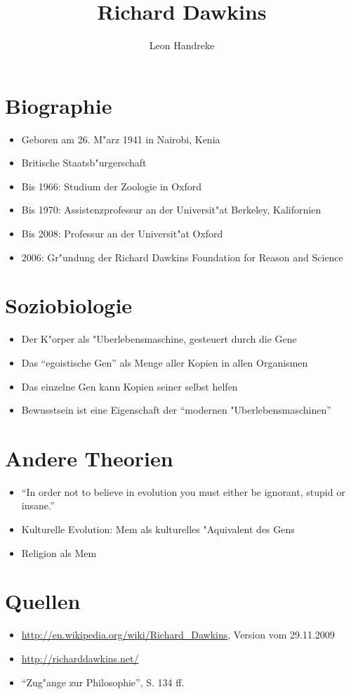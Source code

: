 \documentclass[10pt]{article}
\title{Richard Dawkins}
\author{Leon Handreke}
\date{}                                           %
\begin{document}
\maketitle

\selectfont


\section{Biographie}

\begin{itemize}
\item Geboren am 26. M"arz 1941 in Nairobi, Kenia
\item Britische Staatsb"urgerschaft
\item Bis 1966: Studium der Zoologie in Oxford
\item Bis 1970: Assistenzprofessur an der Universit"at Berkeley, Kalifornien
\item Bis 2008: Professur an der Universit"at Oxford
\item 2006: Gr"undung der Richard Dawkins Foundation for Reason and Science
\end{itemize}


\section{Soziobiologie}

\begin{itemize}
\item Der K"orper als "Uberlebensmaschine, gesteuert durch die Gene
\item Das ``egoistische Gen'' als Menge aller Kopien in allen Organismen
\item Das einzelne Gen kann Kopien seiner selbst helfen
\item Bewusstsein ist eine Eigenschaft der ``modernen "Uberlebensmaschinen''
\end{itemize}

\section{Andere Theorien}
\begin{itemize}
\item ``In order not to believe in evolution you must either be ignorant, stupid or insane.''
\item Kulturelle Evolution: Mem als kulturelles "Aquivalent des Gens
\item Religion als Mem
\end{itemize}



\section{Quellen}
\begin{itemize}
\item \url{http://en.wikipedia.org/wiki/Richard_Dawkins}, Version vom 29.11.2009
\item \url{http://richarddawkins.net/}
\item ``Zug"ange zur Philosophie'', S. 134 ff.
\end{itemize}
\end{document}
